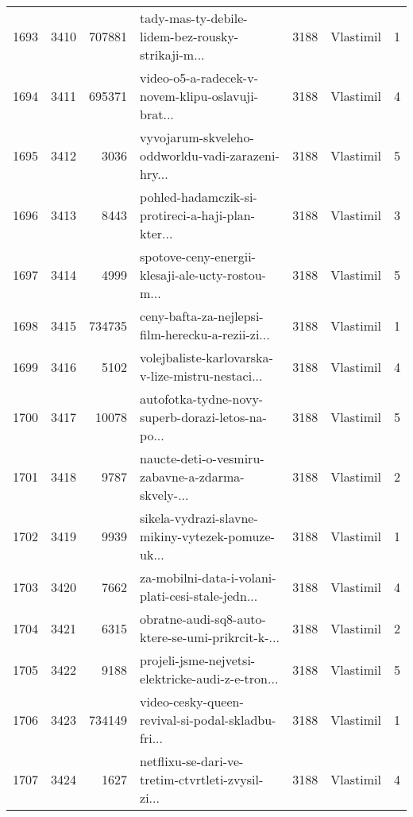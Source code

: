 \begin{tabular}{lrrlrlr}
1693 &       3410 &   707881 &  tady-mas-ty-debile-lidem-bez-rousky-strikaji-m... &     3188 &                    Vlastimil &               1 \\
1694 &       3411 &   695371 &  video-o5-a-radecek-v-novem-klipu-oslavuji-brat... &     3188 &                    Vlastimil &               4 \\
1695 &       3412 &     3036 &  vyvojarum-skveleho-oddworldu-vadi-zarazeni-hry... &     3188 &                    Vlastimil &               5 \\
1696 &       3413 &     8443 &  pohled-hadamczik-si-protireci-a-haji-plan-kter... &     3188 &                    Vlastimil &               3 \\
1697 &       3414 &     4999 &  spotove-ceny-energii-klesaji-ale-ucty-rostou-m... &     3188 &                    Vlastimil &               5 \\
1698 &       3415 &   734735 &  ceny-bafta-za-nejlepsi-film-herecku-a-rezii-zi... &     3188 &                    Vlastimil &               1 \\
1699 &       3416 &     5102 &  volejbaliste-karlovarska-v-lize-mistru-nestaci... &     3188 &                    Vlastimil &               4 \\
1700 &       3417 &    10078 &  autofotka-tydne-novy-superb-dorazi-letos-na-po... &     3188 &                    Vlastimil &               5 \\
1701 &       3418 &     9787 &  naucte-deti-o-vesmiru-zabavne-a-zdarma-skvely-... &     3188 &                    Vlastimil &               2 \\
1702 &       3419 &     9939 &  sikela-vydrazi-slavne-mikiny-vytezek-pomuze-uk... &     3188 &                    Vlastimil &               1 \\
1703 &       3420 &     7662 &  za-mobilni-data-i-volani-plati-cesi-stale-jedn... &     3188 &                    Vlastimil &               4 \\
1704 &       3421 &     6315 &  obratne-audi-sq8-auto-ktere-se-umi-prikrcit-k-... &     3188 &                    Vlastimil &               2 \\
1705 &       3422 &     9188 &  projeli-jsme-nejvetsi-elektricke-audi-z-e-tron... &     3188 &                    Vlastimil &               5 \\
1706 &       3423 &   734149 &  video-cesky-queen-revival-si-podal-skladbu-fri... &     3188 &                    Vlastimil &               1 \\
1707 &       3424 &     1627 &  netflixu-se-dari-ve-tretim-ctvrtleti-zvysil-zi... &     3188 &                    Vlastimil &               4 \\

\end{tabular}
